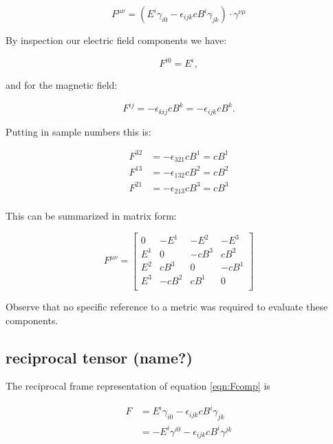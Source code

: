 \documentclass{article}
\begin{document}
\begin{equation*}
F^{{\mu} {\nu}} = \left( E^i \gamma_{i 0} - \epsilon_{i j k} c B^i \gamma_{j k} \right) \cdot \gamma^{\nu\mu}
\end{equation*}

By inspection our electric field components we have:

\begin{equation*}
F^{i0} = E^i,
\end{equation*}

and for the magnetic field:

\begin{equation*}
F^{{i} {j}} = - \epsilon_{k i j} c B^k = - \epsilon_{i j k} c B^k.
\end{equation*}

Putting in sample numbers this is:

\begin{align*}
F^{{3} {2}} &= - \epsilon_{3 2 1} c B^1 = c B^1 \\
F^{{1} {3}} &= - \epsilon_{1 3 2} c B^2 = c B^2 \\
F^{{2} {1}} &= - \epsilon_{2 1 3} c B^3 = c B^3 \\
\end{align*}

This can be summarized in matrix form:

\begin{equation}\label{eqn:matrixtensor}
F^{\mu\nu} =
\begin{bmatrix}
0   & -E^1 & -E^2 & -E^3 \\
E^1 &   0  & -c B^3 &  c B^2 \\
E^2 &  c B^3 &   0  & -c B^1 \\
E^3 & -c B^2 &  c B^1 &   0  \\
\end{bmatrix}
\end{equation}

Observe that no specific reference to a metric was required to evaluate these components.

\subsection{ reciprocal tensor (name?) }

The reciprocal frame representation of equation \ref{eqn:Fcomp} is %

\begin{align*}
F
&= E^i \gamma_{i 0} - \epsilon_{i j k} c B^i \gamma_{j k} \\
&= -E^i \gamma^{i 0} - \epsilon_{i j k} c B^i \gamma^{j k}
\end{align*}
\end{document}

